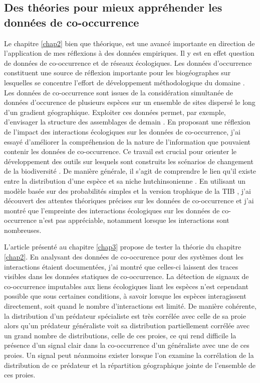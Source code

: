 \subsection*{Des théories pour mieux appréhender les données de
co-occurrence}\label{des-thuxe9ories-pour-mieux-appruxe9hender-les-donnuxe9es-de-co-occurrence}

Le chapitre \ref{chap2} bien que théorique, est une avancé importante en
direction de l'application de mes réflexions à des données empiriques.
Il y est en effet question de données de co-occurrence et de réseaux
écologiques. Les données d'occurrence constituent une source de
réflexion importante pour les biogéographes sur lesquelles se concentre
l'effort de développement méthodologique du domaine
\citep{Elith2006, Phillips2006, Pollock2014}. Les données de
co-occurrence sont issues de la considération simultanée de données
d'occurence de plusieurs espèces sur un ensemble de sites dispersé le
long d'un gradient géographique. Exploiter ces données permet, par
exemple, d'envisager la structure des assemblages de demain
\citep{Albouy2012}. En proposant une réflexion de l'impact des
interactions écologiques sur les données de co-occurrence, j'ai essayé
d'améliorer la compréhension de la nature de l'information que pouvaient
contenir les données de co-occurrence. Ce travail est crucial pour
orienter le développement des outils sur lesquels sont construits les
scénarios de changement de la biodiversité \citep{Godsoe2015}. De
manière générale, il s'agit de comprendre le lien qu'il existe entre la
distribution d'une espèce et sa niche hutchinsonienne
\citep{Pulliam2000, Godsoe2010a}. En utilisant un modèle basée sur des
probabilités simples et la version trophique de la TIB
\citep{Gravel2011}, j'ai découvert des attentes théoriques précises sur
les données de co-occurrence et j'ai montré que l'empreinte des
interactions écologiques sur les données de co-occurrence n'est pas
appréciable, notamment lorsque les interactions sont nombreuses.

L'article présenté au chapitre \ref{chap3} propose de tester la théorie
du chapitre \ref{chap2}. En analysant des données de co-occurence pour
des systèmes dont les interactions étaient documentées, j'ai montré que
celles-ci laissent des traces visibles dans les données statiques de
co-occurrence. La détection de signaux de co-occurrence imputables aux
liens écologiques liant les espèces n'est cependant possible que sous
certaines conditions, à savoir lorsque les espèces interagissent
directement, soit quand le nombre d'interactions est limité. De manière
cohérente, la distribution d'un prédateur spécialiste est très corrélée
avec celle de sa proie alors qu'un prédateur généraliste voit sa
distribution partiellement corrélée avec un grand nombre de
distributions, celle de ces proies, ce qui rend difficile la présence
d'un signal clair dans la co-occurrence d'un généraliste avec une de ces
proies. Un signal peut néanmoins exister lorsque l'on examine la
corrélation de la distribution de ce prédateur et la répartition
géographique jointe de l'ensemble de ces proies.

